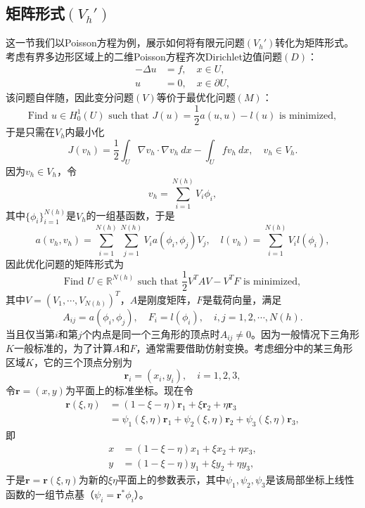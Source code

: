 \documentclass[a4paper,10pt]{ctexart}
\begin{document}
\subsection{矩阵形式\texorpdfstring{$(V_h')$}{}}
这一节我们以Poisson方程为例，展示如何将有限元问题$ (V_h') $转化为矩阵形式。考虑有界多边形区域上的二维Poisson方程齐次Dirichlet边值问题$ (D) $：
\begin{equation}
    \begin{aligned}
        -\Delta u &= f,\quad x\in U,\\
        u &= 0,\quad x\in \partial U,
    \end{aligned}
\end{equation}
该问题自伴随，因此变分问题$ (V) $等价于最优化问题$ (M) $：
\begin{equation}
    \text{Find } u\in H^1_0(U) \text{ such that } J(u) = \frac{1}{2}a(u,u) - l(u) \text{ is minimized},
\end{equation}
于是只需在$ V_h $内最小化
\[
    J(v_h) = \frac{1}{2}\int_U \nabla v_h\cdot \nabla v_h\ d x - \int_U fv_h\ d x,\quad v_h\in V_h.
\]
因为$ v_h\in V_h $，令
\[
    v_h = \sum_{i=1}^{N(h)} V_i\phi_i,
\]
其中$ \{\phi_i\}_{i=1}^{N(h)} $是$ V_h $的一组基函数，于是
\[
    a(v_h,v_h) = \sum_{i=1}^{N(h)}\sum_{j=1}^{N(h)} V_ia(\phi_i,\phi_j)V_j,\quad l(v_h) = \sum_{i=1}^{N(h)}V_il(\phi_i),
\]
因此优化问题的矩阵形式为
\begin{equation}
    \text{Find } U\in \mathbb{R}^{N(h)} \text{ such that } \frac{1}{2}V^T A V - V^T F \text{ is minimized},
\end{equation}
其中$ V = (V_1,\cdots ,V_{N(h)})^T $，$ A $是刚度矩阵，$ F $是载荷向量，满足
\[
    A_{ij} = a(\phi_i,\phi_j),\quad F_i = l(\phi_i),\quad i,j=1,2,\cdots ,N(h).  
\]
当且仅当第$ i $和第$ j $个内点是同一个三角形的顶点时$ A_{ij}\ne 0 $。因为一般情况下三角形$ K $一般标准的，为了计算$ A $和$ F $，通常需要借助仿射变换。考虑细分中的某三角形区域$ K $，它的三个顶点分别为
\[
    \bm{r}_i = (x_i,y_i),\quad i=1,2,3,
\]
令$ \bm{r} = (x,y) $为平面上的标准坐标。现在令
\begin{equation}
    \begin{aligned}
        \bm{r}(\xi,\eta) 
        &= (1-\xi-\eta)\bm{r}_1 + \xi\bm{r}_2 + \eta\bm{r}_3\\
        &= \psi_1(\xi,\eta) \bm{r}_1 + \psi_2(\xi,\eta) \bm{r}_2 + \psi_3(\xi,\eta) \bm{r}_3,
    \end{aligned}
\end{equation}
即
\begin{equation}
    \begin{aligned}
        x &= (1-\xi-\eta)x_1 + \xi x_2 + \eta x_3,\\
        y &= (1-\xi-\eta)y_1 + \xi y_2 + \eta y_3,
    \end{aligned}
\end{equation}
于是$ \bm{r} = \bm{r}(\xi,\eta) $为新的$ \xi\eta $平面上的参数表示，其中$ \psi_1,\psi_2,\psi_3 $是该局部坐标上线性函数的一组节点基（$ \psi_i = \bm{r}^* \phi_i $）。
\end{document}
